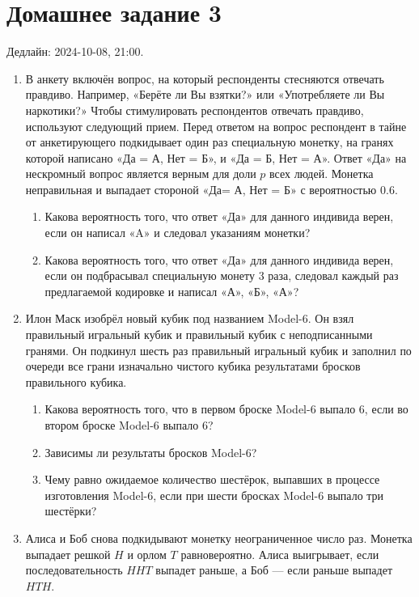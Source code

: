 \section*{Домашнее задание 3}

Дедлайн: 2024-10-08, 21:00.

\begin{enumerate}


\item В анкету включён вопрос, на который респонденты стесняются отвечать правдиво. 
Например, «Берёте ли Вы взятки?» или «Употребляете ли Вы наркотики?»
Чтобы стимулировать респондентов отвечать правдиво, используют следующий прием. 
Перед ответом на вопрос респондент в тайне от анкетирующего подкидывает один раз специальную монетку, на гранях которой написано «Да = А, Нет = Б»,
и «Да = Б, Нет = А». 
Ответ «Да» на нескромный вопрос является верным для доли $p$ всех людей. 
Монетка неправильная и выпадает стороной «Да= А, Нет = Б» с вероятностью $0.6$.

\begin{enumerate}
    \item Какова вероятность того, что ответ «Да» для данного индивида верен, если он написал «A» и следовал указаниям монетки?
    \item Какова вероятность того, что ответ «Да» для данного индивида верен, если он подбрасывал специальную монету 3 раза,
    следовал каждый раз предлагаемой кодировке и написал «А», «Б», «А»?
\end{enumerate}

\item Илон Маск изобрёл новый кубик под названием Model-6. 
Он взял правильный игральный кубик и правильный кубик с неподписанными гранями. 
Он подкинул шесть раз правильный игральный кубик и заполнил по очереди все грани изначально чистого кубика результатами бросков правильного кубика.
\begin{enumerate}
    \item Какова вероятность того, что в первом броске Model-6 выпало 6, если во втором броске Model-6 выпало 6?
    \item Зависимы ли результаты бросков Model-6?
    \item Чему равно ожидаемое количество шестёрок, выпавших в процессе изготовления Model-6, если при шести бросках Model-6 выпало три шестёрки?
\end{enumerate}


\item Алиса и Боб снова подкидывают монетку неограниченное число раз. 
Монетка выпадает решкой $H$ и орлом $T$ равновероятно. 
Алиса выигрывает, если последовательность $HHT$ выпадет раньше, а Боб — если раньше выпадет $HTH$.


\end{enumerate}
